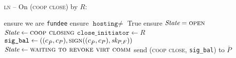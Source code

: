 \begin{center}
  \begin{processbox}{\textsc{ln} -- On (\textsc{coop close}) by $R$:}
    \begin{algorithmic}[1]
      \State ensure we are \texttt{fundee}
      \State ensure $\texttt{hosting} \neq$ True
      \State ensure $\itistate = \textsc{open}$
      \State $\itistate \gets \textsc{coop closing}$
      \label{code:ln:coop-close-fundee:state-change}
      \State $\texttt{close\_initiator} \gets R$
      \State $\texttt{sig\_bal} \gets ((c_{\bar{P}}, c_P),
      \textsc{sign}((c_{\bar{P}}, c_P), \textit{sk}_{P, F}))$
      \label{code:ln:coop-close-fundee:balance-sign}
      \State $\itistate \gets \textsc{waiting to revoke virt comm}$
      \State send (\textsc{coop close}, \texttt{sig\_bal}) to $\bar{P}$
    \end{algorithmic}
  \end{processbox}
  \label{code:ln:coop-close-fundee}
\end{center} \ \\

